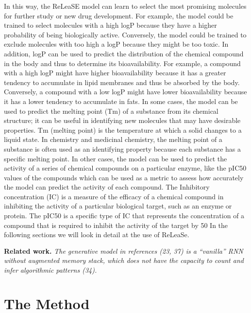 \documentclass[conference]{IEEEtran}
\newcommand{\mypar}[1]{{\bf #1.}}
\begin{document}
In this way, the ReLeaSE model can learn to select the most promising molecules for further study or new drug development. 
For example, the model could be trained to select molecules with a high logP because they have a higher probability of being biologically active. Conversely, the model could be trained to exclude molecules with too high a logP because they might be too toxic. In addition, logP can be used to predict the distribution of the chemical compound in the body and thus to determine its bioavailability. For example, a compound with a high logP might have higher bioavailability because it has a greater tendency to accumulate in lipid membranes and thus be absorbed by the body. Conversely, a compound with a low logP might have lower bioavailability because it has a lower tendency to accumulate in fats.
In some cases, the model can be used to predict the melting point (Tm) of a substance from its chemical structure; it can be useful in identifying new molecules that may have desirable properties. Tm (melting point) is the temperature at which a solid changes to a liquid state. In chemistry and medicinal chemistry, the melting point of a substance is often used as an identifying property because each substance has a specific melting point. 
In other cases, the model can be used to predict the activity of a series of chemical compounds on a particular enzyme, like the pIC50 values of the compounds which can be used as a metric to assess how accurately the model can predict the activity of each compound. The Inhibitory concentration (IC) is a measure of the efficacy of a chemical compound in inhibiting the activity of a particular biological target, such as an enzyme or protein. The pIC50 is a specific type of IC that represents the concentration of a compound that is required to inhibit the activity of the target by 50%
In the following sections we will look in detail at the use of ReLeaSe.

\mypar{Related work} 
\textit{The generative
model in references (23, 37) is a “vanilla” RNN without augmented
memory stack, which does not have the capacity to count and infer
algorithmic patterns (34).
}

\section{The Method}\label{sec:The Method}
\end{document}
